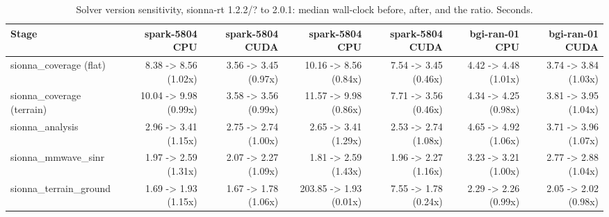 \begin{table}[t]
  \centering
  \caption{Solver version sensitivity, sionna-rt 1.2.2/? to 2.0.1: median wall-clock before, after, and the ratio. Seconds.}
  \label{tab:versionwall}
  \begin{tabular}{lrrrrrr}
    \toprule
    Stage & spark-5804 CPU & spark-5804 CUDA & spark-5804 CPU & spark-5804 CUDA & bgi-ran-01 CPU & bgi-ran-01 CUDA \\
    \midrule
    sionna\_coverage (flat) & 8.38 -> 8.56 (1.02x) & 3.56 -> 3.45 (0.97x) & 10.16 -> 8.56 (0.84x) & 7.54 -> 3.45 (0.46x) & 4.42 -> 4.48 (1.01x) & 3.74 -> 3.84 (1.03x) \\
    sionna\_coverage (terrain) & 10.04 -> 9.98 (0.99x) & 3.58 -> 3.56 (0.99x) & 11.57 -> 9.98 (0.86x) & 7.71 -> 3.56 (0.46x) & 4.34 -> 4.25 (0.98x) & 3.81 -> 3.95 (1.04x) \\
    sionna\_analysis & 2.96 -> 3.41 (1.15x) & 2.75 -> 2.74 (1.00x) & 2.65 -> 3.41 (1.29x) & 2.53 -> 2.74 (1.08x) & 4.65 -> 4.92 (1.06x) & 3.71 -> 3.96 (1.07x) \\
    sionna\_mmwave\_sinr & 1.97 -> 2.59 (1.31x) & 2.07 -> 2.27 (1.09x) & 1.81 -> 2.59 (1.43x) & 1.96 -> 2.27 (1.16x) & 3.23 -> 3.21 (1.00x) & 2.77 -> 2.88 (1.04x) \\
    sionna\_terrain\_ground & 1.69 -> 1.93 (1.15x) & 1.67 -> 1.78 (1.06x) & 203.85 -> 1.93 (0.01x) & 7.55 -> 1.78 (0.24x) & 2.29 -> 2.26 (0.99x) & 2.05 -> 2.02 (0.98x) \\
    \bottomrule
  \end{tabular}
\end{table}
